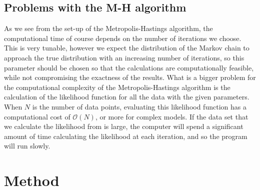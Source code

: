 \documentclass{article}
\theoremstyle{definition}
\begin{document}
\subsection{Problems with the M-H algorithm}
As we see from the set-up of the Metropolis-Hastings algorithm, the computational time of course depends on the number of iterations we choose. This is very tunable, however we expect the distribution of the Markov chain to approach the true distribution with an increasing number of iterations, so this parameter should be chosen so that the calculations are computationally feasible, while not compromising the exactness of the results. 
What is a bigger problem for the computational complexity of the Metropolis-Hastings algorithm is the calculation of the likelihood function for all the data with the given parameters. When $N$ is the number of data points, evaluating this likelihood function has a computational cost of  $\mathcal{O}(N)$, or more for complex models. If the data set that we calculate the likelihood from is large, the computer will spend a significant amount of time calculating the likelihood at each iteration, and so the program will run slowly. 
\section{Method}
\end{document}
